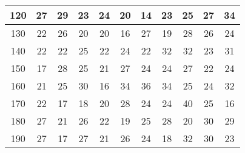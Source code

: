 \documentclass[a4paper]{article}
\begin{document}
\begin{table}[h!]
\begin{tabular}{|c|*{10}{c|}}
\hline
120             & 27         & 29         & 23         & 24         & 20         & 14         & 23         & 25         & 27         & 34          \\
\hline
130             & 22         & 26         & 20         & 20         & 16         & 27         & 19         & 28         & 26         & 24          \\
\hline
140             & 22         & 22         & 25         & 22         & 24         & 22         & 32         & 32         & 23         & 31          \\
\hline
150             & 17         & 28         & 25         & 21         & 27         & 24         & 24         & 27         & 22         & 24          \\
\hline
160             & 21         & 25         & 30         & 16         & 34         & 36         & 34         & 25         & 24         & 32          \\
\hline
170             & 22         & 17         & 18         & 20         & 28         & 24         & 24         & 40         & 25         & 16          \\
\hline
180             & 27         & 21         & 26         & 22         & 19         & 25         & 28         & 20         & 30         & 29          \\
\hline
190             & 27         & 17         & 27         & 21         & 26         & 24         & 18         & 32         & 30         & 23          \\
\hline
\end{tabular}
\end{table}
\end{document}

